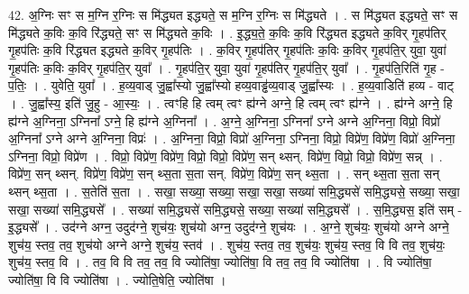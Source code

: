 \documentclass[17pt]{extarticle}
\begin{document}
42. अ॒ग्निः सꣳ स म॒ग्नि र॒ग्निः स मि॑द्ध्यत इद्ध्यते॒ स म॒ग्नि र॒ग्निः स मि॑द्ध्यते । . स मि॑द्ध्यत इद्ध्यते॒ सꣳ स मि॑द्ध्यते क॒विः क॒वि रि॑द्ध्यते॒ सꣳ स मि॑द्ध्यते क॒विः । . इ॒द्ध्य॒ते॒ क॒विः क॒वि रि॑द्ध्यत इद्ध्यते क॒विर् गृ॒हप॑तिर् गृ॒हप॑तिः क॒वि रि॑द्ध्यत इद्ध्यते क॒विर् गृ॒हप॑तिः । . क॒विर् गृ॒हप॑तिर् गृ॒हप॑तिः क॒विः क॒विर् गृ॒हप॑ति॒र् युवा॒ युवा॑ गृ॒हप॑तिः क॒विः क॒विर् गृ॒हप॑ति॒र् युवा᳚ । . गृ॒हप॑ति॒र् युवा॒ युवा॑ गृ॒हप॑तिर् गृ॒हप॑ति॒र् युवा᳚ । . गृ॒हप॑ति॒रिति॑ गृ॒ह - प॒तिः॒ । . युवेति॒ युवा᳚ । . ह॒व्य॒वाड् जु॒ह्वा᳚स्यो जु॒ह्वा᳚स्यो हव्य॒वाड्ढ॑व्य॒वाड् जु॒ह्वा᳚स्यः । . ह॒व्य॒वाडिति॑ हव्य - वाट् । . जु॒ह्वा᳚स्य॒ इति॑ जु॒हु - आ॒स्यः॒ । . त्वꣳहि हि त्वम् त्वꣳ ह्य॑ग्ने अग्ने॒ हि त्वम् त्वꣳ ह्य॑ग्ने । . ह्य॑ग्ने अग्ने॒ हि ह्य॑ग्ने अ॒ग्निना॒ ऽग्निना᳚ ऽग्ने॒ हि ह्य॑ग्ने अ॒ग्निना᳚ । . अ॒ग्ने॒ अ॒ग्निना॒ ऽग्निना᳚ ऽग्ने अग्ने अ॒ग्निना॒ विप्रो॒ विप्रो॑ अ॒ग्निना᳚ ऽग्ने अग्ने अ॒ग्निना॒ विप्रः॑ । . अ॒ग्निना॒ विप्रो॒ विप्रो॑ अ॒ग्निना॒ ऽग्निना॒ विप्रो॒ विप्रे॑ण॒ विप्रे॑ण॒ विप्रो॑ अ॒ग्निना॒ ऽग्निना॒ विप्रो॒ विप्रे॑ण । . विप्रो॒ विप्रे॑ण॒ विप्रे॑ण॒ विप्रो॒ विप्रो॒ विप्रे॑ण॒ सन् थ्सन्. विप्रे॑ण॒ विप्रो॒ विप्रो॒ विप्रे॑ण॒ सन्न् । . विप्रे॑ण॒ सन् थ्सन्. विप्रे॑ण॒ विप्रे॑ण॒ सन् थ्स॒ता स॒ता सन्. विप्रे॑ण॒ विप्रे॑ण॒ सन् थ्स॒ता । . सन् थ्स॒ता स॒ता सन् थ्सन् थ्स॒ता । . स॒तेति॑ स॒ता । . सखा॒ सख्या॒ सख्या॒ सखा॒ सखा॒ सख्या॑ समि॒द्ध्यसे॑ समि॒द्ध्यसे॒ सख्या॒ सखा॒ सखा॒ सख्या॑ समि॒द्ध्यसे᳚ । . सख्या॑ समि॒द्ध्यसे॑ समि॒द्ध्यसे॒ सख्या॒ सख्या॑ समि॒द्ध्यसे᳚ । . स॒मि॒द्ध्यस॒ इति॑ सम् - इ॒द्ध्यसे᳚ । . उद॑ग्ने अग्न॒ उदुद॑ग्ने॒ शुच॑यः॒ शुच॑यो अग्न॒ उदुद॑ग्ने॒ शुच॑यः । . अ॒ग्ने॒ शुच॑यः॒ शुच॑यो अग्ने अग्ने॒ शुच॑य॒ स्तव॒ तव॒ शुच॑यो अग्ने अग्ने॒ शुच॑य॒ स्तव॑ । . शुच॑य॒ स्तव॒ तव॒ शुच॑यः॒ शुच॑य॒ स्तव॒ वि वि तव॒ शुच॑यः॒ शुच॑य॒ स्तव॒ वि । . तव॒ वि वि तव॒ तव॒ वि ज्योति॑षा॒ ज्योति॑षा॒ वि तव॒ तव॒ वि ज्योति॑षा । . वि ज्योति॑षा॒ ज्योति॑षा॒ वि वि ज्योति॑षा । . ज्योति॒षेति॒ ज्योति॑षा । \newline
\pagebreak
\end{document}
